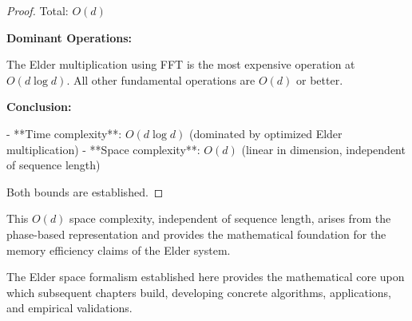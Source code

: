 \begin{proof}
Total: $O(d)$

\textbf{Dominant Operations:}

The Elder multiplication using FFT is the most expensive operation at $O(d \log d)$. All other fundamental operations are $O(d)$ or better.

\textbf{Conclusion:}

- **Time complexity**: $O(d \log d)$ (dominated by optimized Elder multiplication)
- **Space complexity**: $O(d)$ (linear in dimension, independent of sequence length)

Both bounds are established.
\end{proof}

This $O(d)$ space complexity, independent of sequence length, arises from the phase-based representation and provides the mathematical foundation for the memory efficiency claims of the Elder system.

The Elder space formalism established here provides the mathematical core upon which subsequent chapters build, developing concrete algorithms, applications, and empirical validations.